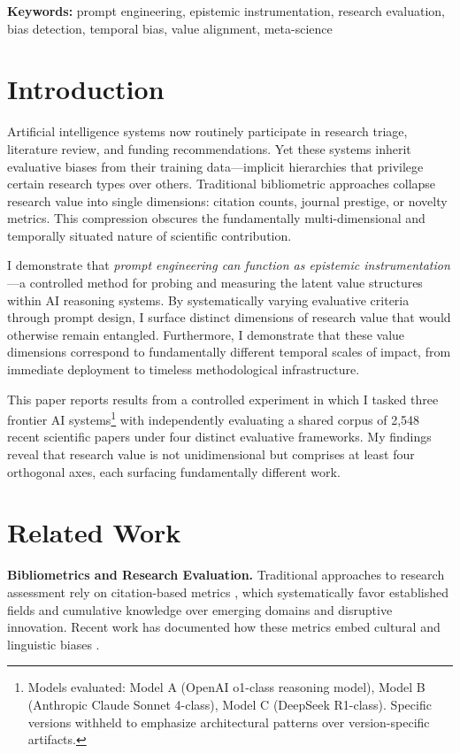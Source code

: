 \documentclass{article}
\begin{document}
\noindent\textbf{Keywords:} prompt engineering, epistemic instrumentation, research evaluation, bias detection, temporal bias, value alignment, meta-science

\section{Introduction}

Artificial intelligence systems now routinely participate in research triage, literature review, and funding recommendations. Yet these systems inherit evaluative biases from their training data—implicit hierarchies that privilege certain research types over others. Traditional bibliometric approaches collapse research value into single dimensions: citation counts, journal prestige, or novelty metrics. This compression obscures the fundamentally multi-dimensional and temporally situated nature of scientific contribution.

I demonstrate that \textit{prompt engineering can function as epistemic instrumentation}—a controlled method for probing and measuring the latent value structures within AI reasoning systems. By systematically varying evaluative criteria through prompt design, I surface distinct dimensions of research value that would otherwise remain entangled. Furthermore, I demonstrate that these value dimensions correspond to fundamentally different temporal scales of impact, from immediate deployment to timeless methodological infrastructure.

This paper reports results from a controlled experiment in which I tasked three frontier AI systems\footnote{Models evaluated: Model A (OpenAI o1-class reasoning model), Model B (Anthropic Claude Sonnet 4-class), Model C (DeepSeek R1-class). Specific versions withheld to emphasize architectural patterns over version-specific artifacts.} with independently evaluating a shared corpus of 2,548 recent scientific papers under four distinct evaluative frameworks. My findings reveal that research value is not unidimensional but comprises at least four orthogonal axes, each surfacing fundamentally different work.

\section{Related Work}

\textbf{Bibliometrics and Research Evaluation.} Traditional approaches to research assessment rely on citation-based metrics \cite{fortunato2018science, bornmann2008citation}, which systematically favor established fields and cumulative knowledge over emerging domains and disruptive innovation. Recent work has documented how these metrics embed cultural and linguistic biases \cite{bender2021dangers}.
\end{document}
